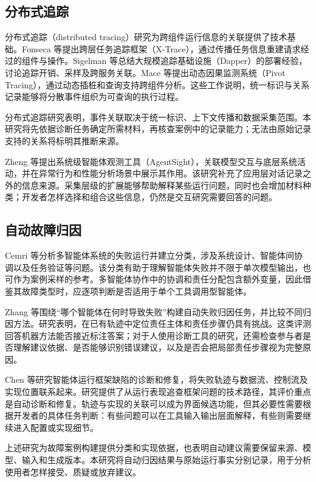 \subsection{分布式追踪}

分布式追踪（distributed tracing）研究为跨组件运行信息的关联提供了技术基础。Fonseca 等\cite{ref30}提出跨层任务追踪框架（X-Trace），通过传播任务信息重建请求经过的组件与操作。Sigelman 等\cite{ref32}总结大规模追踪基础设施（Dapper）的部署经验，讨论追踪开销、采样及跨服务关联。Mace 等\cite{ref31}提出动态因果监测系统（Pivot Tracing），通过动态插桩和查询支持跨组件分析。这些工作说明，统一标识与关系记录能够将分散事件组织为可查询的执行过程。

分布式追踪研究表明，事件关联取决于统一标识、上下文传播和数据采集范围。本研究将先依据诊断任务确定所需材料，再核查案例中的记录能力；无法由原始记录支持的关系将标明其推断来源。

Zheng 等\cite{ref19}提出系统级智能体观测工具（AgentSight），关联模型交互与底层系统活动，并在异常行为和性能分析场景中展示其作用。该研究补充了应用层对话记录之外的信息来源。采集层级的扩展能够帮助解释某些运行问题，同时也会增加材料种类；开发者怎样选择和组合这些信息，仍然是交互研究需要回答的问题。

\subsection{自动故障归因}

Cemri 等\cite{cemri2025mast}分析多智能体系统的失败运行并建立分类，涉及系统设计、智能体间协调以及任务验证等问题。该分类有助于理解智能体失败并不限于单次模型输出，也可作为案例采样的参考。多智能体协作中的协调和责任分配包含额外变量，因此借鉴其故障类型时，应逐项判断是否适用于单个工具调用型智能体。

Zhang 等\cite{ref03}围绕“哪个智能体在何时导致失败”构建自动失败归因任务，并比较不同归因方法。研究表明，在已有轨迹中定位责任主体和责任步骤仍具有挑战。这类评测回答机器方法能否接近标注答案；对于人使用诊断工具的研究，还需检查参与者是否理解建议依据、是否能够识别错误建议，以及是否会把局部责任步骤视为完整原因。

Chen 等\cite{ref20}研究智能体运行框架缺陷的诊断和修复，将失败轨迹与数据流、控制流及实现位置联系起来。研究提供了从运行表现追查框架问题的技术路径，其评价重点是自动诊断和修复。轨迹与实现的关联可以成为界面候选功能，但其必要性需要根据开发者的具体任务判断：有些问题可以在工具输入输出层面解释，有些则需要继续进入配置或实现细节。

上述研究为故障案例构建提供分类和实现依据，也表明自动建议需要保留来源、模型、输入和生成版本。本研究将自动归因结果与原始运行事实分别记录，用于分析使用者怎样接受、质疑或放弃建议。

